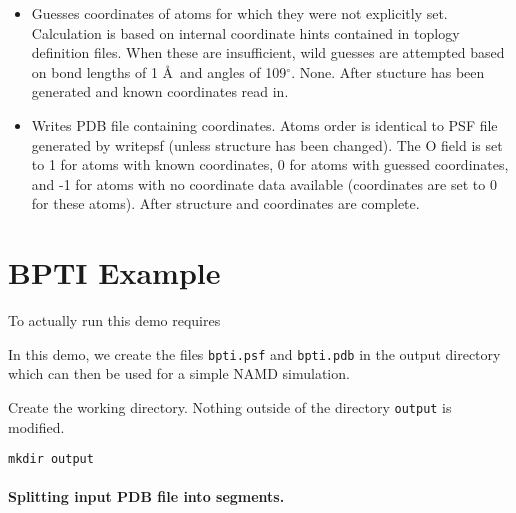 \begin{itemize}
\item {}
{Guesses coordinates of atoms for which they were not explicitly set.
Calculation is based on internal coordinate hints contained in toplogy
definition files.  When these are insufficient, wild guesses are attempted
based on bond lengths of 1 \AA\ and angles of 109$^\circ$.}
{None.}
{After stucture has been generated and known coordinates read in.}

\item {}
{Writes PDB file containing coordinates.  Atoms order is identical to
PSF file generated by writepsf (unless structure has been changed).
The O field is set to 1 for atoms with known coordinates, 0 for atoms
with guessed coordinates, and -1 for atoms with no coordinate data
available (coordinates are set to 0 for these atoms).}
{}
{After structure and coordinates are complete.}

\end{itemize}

\section{BPTI Example}

To actually run this demo requires

In this demo, we create the files \verb#bpti.psf# and \verb#bpti.pdb# in the output directory
which can then be used for a simple NAMD simulation.

Create the working directory.  Nothing outside of the directory \verb#output# is modified.

\begin{verbatim}
mkdir output
\end{verbatim}

\paragraph*{Splitting input PDB file into segments.}

